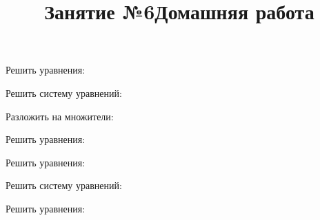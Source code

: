 \title{Занятие №6}
\begin{listofex}
	\item Решить уравнения:
	\begin{enumcols}[itemcolumns=2]
		\item {}
		\item {}
		\item {}
	\end{enumcols}
	\item Решить систему уравнений:
	\begin{enumcols}[itemcolumns=3]
		\item {}
		\item {}
		\item {}
	\end{enumcols}
	\item Разложить на множители:
	\begin{enumcols}[itemcolumns=2]
		\item {}
		\item {}
		\item {}
		\item {}
	\end{enumcols}
	\item Решить уравнения:
	\begin{enumcols}[itemcolumns=2]
		\item {}
		\item {}
		\item {}
		\item {}
		\item {}
	\end{enumcols}
\end{listofex}
\title{Домашняя работа}
\begin{listofex}
	\item Решить уравнения:
	\begin{enumcols}[itemcolumns=2]
		\item {}
		\item {}
		\item {}
	\end{enumcols}
	\item Решить систему уравнений:
	\begin{enumcols}[itemcolumns=3]
		\item {}
		\item {}
		\item {}
	\end{enumcols}
	\item Решить уравнения:
	\begin{enumcols}[itemcolumns=2]
		\item {}
		\item {}
		\item {}
		\item {}
	\end{enumcols}
\end{listofex}